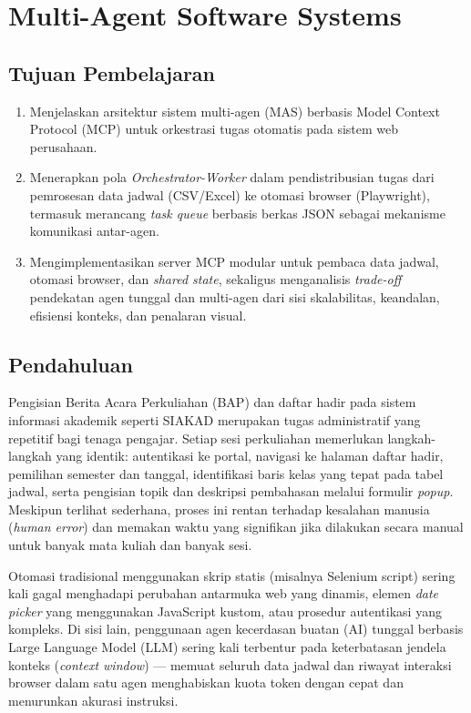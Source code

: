 \chapter{Multi-Agent Software Systems}
\label{chap:multi-agent-siakad}

\section*{Tujuan Pembelajaran}
\begin{enumerate}
  \item Menjelaskan arsitektur sistem multi-agen (MAS) berbasis Model Context Protocol (MCP) untuk orkestrasi tugas otomatis pada sistem web perusahaan.
  \item Menerapkan pola \textit{Orchestrator-Worker} dalam pendistribusian tugas dari pemrosesan data jadwal (CSV/Excel) ke otomasi browser (Playwright), termasuk merancang \textit{task queue} berbasis berkas JSON sebagai mekanisme komunikasi antar-agen.
  \item Mengimplementasikan server MCP modular untuk pembaca data jadwal, otomasi browser, dan \textit{shared state}, sekaligus menganalisis \textit{trade-off} pendekatan agen tunggal dan multi-agen dari sisi skalabilitas, keandalan, efisiensi konteks, dan penalaran visual.
\end{enumerate}

\section{Pendahuluan}

Pengisian Berita Acara Perkuliahan (BAP) dan daftar hadir pada sistem informasi akademik seperti SIAKAD merupakan tugas administratif yang repetitif bagi tenaga pengajar. Setiap sesi perkuliahan memerlukan langkah-langkah yang identik: autentikasi ke portal, navigasi ke halaman daftar hadir, pemilihan semester dan tanggal, identifikasi baris kelas yang tepat pada tabel jadwal, serta pengisian topik dan deskripsi pembahasan melalui formulir \textit{popup}. Meskipun terlihat sederhana, proses ini rentan terhadap kesalahan manusia (\textit{human error}) dan memakan waktu yang signifikan jika dilakukan secara manual untuk banyak mata kuliah dan banyak sesi.

Otomasi tradisional menggunakan skrip statis (misalnya Selenium script) sering kali gagal menghadapi perubahan antarmuka web yang dinamis, elemen \textit{date picker} yang menggunakan JavaScript kustom, atau prosedur autentikasi yang kompleks. Di sisi lain, penggunaan agen kecerdasan buatan (AI) tunggal berbasis Large Language Model (LLM) sering kali terbentur pada keterbatasan jendela konteks (\textit{context window}) --- memuat seluruh data jadwal dan riwayat interaksi browser dalam satu agen menghabiskan kuota token dengan cepat dan menurunkan akurasi instruksi.

